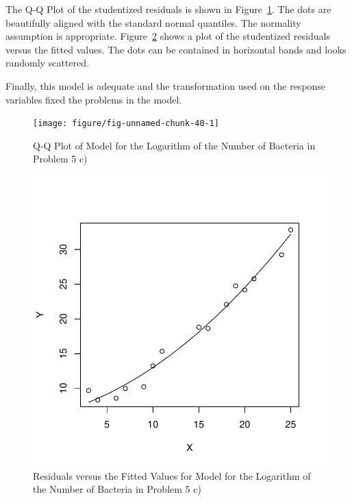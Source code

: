 \begin{solution}{2.22}
\begin{enumerate}
The Q-Q Plot of the studentized residuals is shown in Figure~\ref{fig:simple:bact6}. The dots are beautifully aligned with the standard normal quantiles. The normality assumption is appropriate. Figure~\ref{fig:simple:bact7} shows a plot of the studentized residuals versus the fitted values. The dots can be contained in horizontal bands and looks randomly scattered.

Finally, this model is adequate and the transformation used on the response variables fixed the problems in the model.

\begin{figure}
\begin{center}
\begin{knitrout}
\color{fgcolor}

{\centering \texttt{[image: figure/fig-unnamed-chunk-40-1]}

}



\end{knitrout}
\end{center}
\caption{Q-Q Plot of Model for the Logarithm of the Number of Bacteria in Problem 5 c)} \label{fig:simple:bact6}
\end{figure}

\begin{figure}
\begin{center}
\begin{knitrout}
\color{fgcolor}

{\centering \includegraphics[width=.45\linewidth]{figure/fig-unnamed-chunk-41-1}

}



\end{knitrout}
\end{center}
\caption{Residuals versus the Fitted Values for Model for the Logarithm of the Number of Bacteria in Problem 5 c)}
\label{fig:simple:bact7}
\end{figure}

\end{enumerate}
\end{solution}
